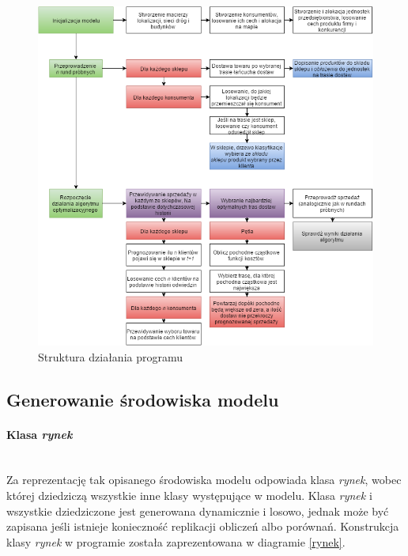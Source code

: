 \documentclass[polish, twoside, 12pt, a4paper]{article}
\theoremstyle{definition}
\theoremstyle{plain}
\theoremstyle{remark}
\begin{document}
\begin{figure}
  \centering
\includegraphics[width=\linewidth]{pictures/Struktura.png}
  \caption{Struktura działania programu}
  \label{fig:struktura}
\end{figure}


\subsection{Generowanie środowiska modelu}
\paragraph{Klasa \textit{rynek}}\mbox{}\\
Za reprezentację tak opisanego środowiska modelu odpowiada klasa \textit{rynek}, wobec której dziedziczą wszystkie inne klasy występujące w modelu. Klasa \textit{rynek} i wszystkie dziedziczone jest generowana dynamicznie i losowo, jednak może być zapisana jeśli istnieje konieczność replikacji obliczeń albo porównań.  Konstrukcja klasy \textit{rynek} w programie została zaprezentowana w diagramie \ref{rynek}. \\

\end{document}
